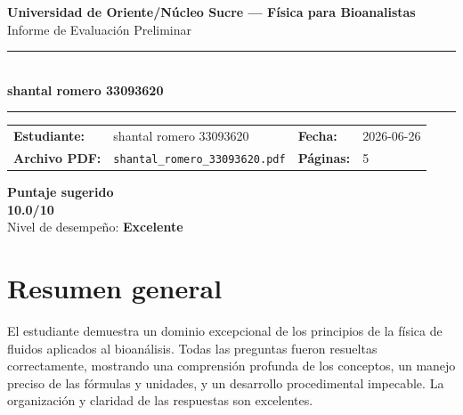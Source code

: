 \documentclass[11pt,a4paper]{article}
\begin{document}
\begin{center}
  {\Large\bfseries\color{azulTitulo} Universidad de Oriente/Núcleo Sucre --- Física para Bioanalistas}\\[4pt]
  {\large Informe de Evaluación Preliminar}\\[12pt]
  \rule{\linewidth}{1.2pt}\\[6pt]
  {\LARGE\bfseries shantal romero 33093620}\\[4pt]
  \rule{\linewidth}{0.6pt}
\end{center}

\vspace{4pt}
\begin{tcolorbox}[cajaTitulo, title=Datos del informe]
\begin{tabular}{@{}llll@{}}
  \textbf{Estudiante:}  & shantal romero 33093620  &
  \textbf{Fecha:}       & 2026-06-26 \\[4pt]
  \textbf{Archivo PDF:} & \texttt{shantal\_romero\_33093620.pdf}  &
  \textbf{Páginas:}     & 5 \\
\end{tabular}
\end{tcolorbox}

\vspace{6pt}
\begin{center}
  \begin{tcolorbox}[
    enhanced,
    colback=white, colframe=desempeno_excelente,
    width=0.62\linewidth,
    boxrule=2pt,
    halign=center, valign=center,
    top=8pt, bottom=8pt,
  ]
    \centering
    {\large\bfseries Puntaje sugerido}\\[6pt]
    {\Huge\bfseries\color{desempeno_excelente} 10.0/10}\\[6pt]
    {\large Nivel de desempeño: \textbf{\color{desempeno_excelente} Excelente}}
  \end{tcolorbox}
\end{center}

\section*{Resumen general}
El estudiante demuestra un dominio excepcional de los principios de la física de fluidos aplicados al bioanálisis. Todas las preguntas fueron resueltas correctamente, mostrando una comprensión profunda de los conceptos, un manejo preciso de las fórmulas y unidades, y un desarrollo procedimental impecable. La organización y claridad de las respuestas son excelentes.
\end{document}
